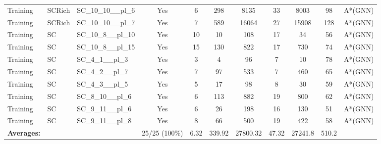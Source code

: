 \documentclass{article}
\begin{document}
\begin{tabular}{lllcccccccc}
Training & SCRich & SC\_10\_10\_\_pl\_6 & Yes & 6 & 298 & 8135 & 33 & 8003 & 98 & A*(GNN) \\
Training & SCRich & SC\_10\_10\_\_pl\_7 & Yes & 7 & 589 & 16064 & 27 & 15908 & 128 & A*(GNN) \\
Training & SC & SC\_10\_8\_\_pl\_10 & Yes & 10 & 10 & 108 & 17 & 34 & 56 & A*(GNN) \\
Training & SC & SC\_10\_8\_\_pl\_15 & Yes & 15 & 130 & 822 & 17 & 730 & 74 & A*(GNN) \\
Training & SC & SC\_4\_1\_\_pl\_3 & Yes & 3 & 4 & 96 & 7 & 10 & 78 & A*(GNN) \\
Training & SC & SC\_4\_2\_\_pl\_7 & Yes & 7 & 97 & 533 & 7 & 460 & 65 & A*(GNN) \\
Training & SC & SC\_4\_3\_\_pl\_5 & Yes & 5 & 17 & 98 & 8 & 30 & 59 & A*(GNN) \\
Training & SC & SC\_8\_10\_\_pl\_6 & Yes & 6 & 113 & 882 & 19 & 800 & 62 & A*(GNN) \\
Training & SC & SC\_9\_11\_\_pl\_6 & Yes & 6 & 26 & 198 & 16 & 130 & 51 & A*(GNN) \\
Training & SC & SC\_9\_11\_\_pl\_8 & Yes & 8 & 66 & 500 & 19 & 422 & 58 & A*(GNN) \\
\textbf{Averages:} & & & 25/25 (100\%) & 6.32 & 339.92 & 27800.32 & 47.32 & 27241.8 & 510.2 & \\
\bottomrule
\end{tabular}
\newpage
\end{document}
